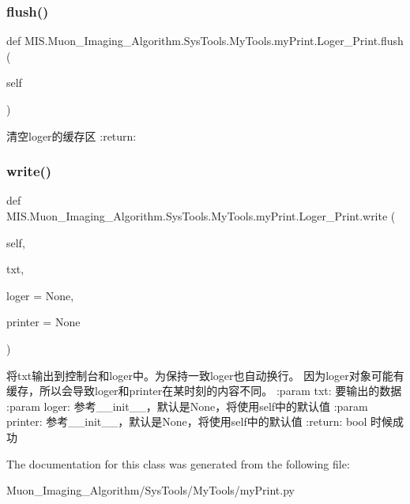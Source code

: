 \subsubsection{\texorpdfstring{flush()}{flush()}}
{\footnotesize\ttfamily def M\+I\+S.\+Muon\+\_\+\+Imaging\+\_\+\+Algorithm.\+Sys\+Tools.\+My\+Tools.\+my\+Print.\+Loger\+\_\+\+Print.\+flush (\begin{DoxyParamCaption}\item[{}]{self }\end{DoxyParamCaption})}

\begin{DoxyVerb}清空loger的缓存区
:return:
\end{DoxyVerb}
 \mbox{\label{classMIS_1_1Muon__Imaging__Algorithm_1_1SysTools_1_1MyTools_1_1myPrint_1_1Loger__Print_aecdfb74ece0549a79e76494f24d9d284}} 
\subsubsection{\texorpdfstring{write()}{write()}}
{\footnotesize\ttfamily def M\+I\+S.\+Muon\+\_\+\+Imaging\+\_\+\+Algorithm.\+Sys\+Tools.\+My\+Tools.\+my\+Print.\+Loger\+\_\+\+Print.\+write (\begin{DoxyParamCaption}\item[{}]{self,  }\item[{}]{txt,  }\item[{}]{loger = {\ttfamily None},  }\item[{}]{printer = {\ttfamily None} }\end{DoxyParamCaption})}

\begin{DoxyVerb}将txt输出到控制台和loger中。为保持一致loger也自动换行。
因为loger对象可能有缓存，所以会导致loger和printer在某时刻的内容不同。
:param txt: 要输出的数据
:param loger: 参考__init__，默认是None，将使用self中的默认值
:param printer: 参考__init__，默认是None，将使用self中的默认值
:return: bool 时候成功
\end{DoxyVerb}
 

The documentation for this class was generated from the following file\+:\begin{DoxyCompactItemize}
\item 
Muon\+\_\+\+Imaging\+\_\+\+Algorithm/\+Sys\+Tools/\+My\+Tools/my\+Print.\+py\end{DoxyCompactItemize}
